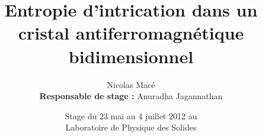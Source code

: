 \documentclass[10pt,a4paper]{beamer}
\title[Entropie d'intrication dans un antiferromagnétique]{Entropie d'intrication dans un cristal antiferromagnétique bidimensionnel}
\date{Stage du 23 mai au 4 juillet 2012 au \\ \Huge{Laboratoire de Physique des Solides}}
\author{Nicolas Macé\\ \textbf{Responsable de stage :} Anuradha Jagannathan}
\newcommand{\1}{\ensuremath{\ket{\om_1\bom_1}}\xspace}
\newcommand{\2}{\ensuremath{\ket{\om_2\bom_2}}\xspace}
\begin{document}
\begin{frame}
\begin{titlepage}
\end{titlepage}
\end{frame}

%
%  
%
\end{document}
